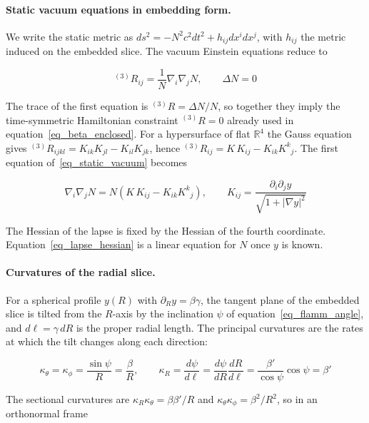\documentclass[anonymous]{iopjournal}
\begin{document}
\paragraph{Static vacuum equations in embedding form.}
We write the static metric as $ds^2=-N^2c^2dt^2+h_{ij}dx^idx^j$, with $h_{ij}$ the metric induced on the embedded slice. The vacuum Einstein equations reduce to

\begin{equation}\label{eq_static_vacuum}
    {}^{(3)}\!R_{ij}=\frac{1}{N}\nabla_i\nabla_jN,
    \qquad
    \Delta N=0
\end{equation}

The trace of the first equation is ${}^{(3)}\!R=\Delta N/N$, so together they imply the time-symmetric Hamiltonian constraint ${}^{(3)}\!R=0$ already used in equation~\eqref{eq_beta_enclosed}. For a hypersurface of flat $\mathbb{R}^4$ the Gauss equation gives ${}^{(3)}\!R_{ijkl}=K_{ik}K_{jl}-K_{il}K_{jk}$, hence ${}^{(3)}\!R_{ij}=K\,K_{ij}-K_{ik}K^{k}{}_{j}$. The first equation of~\eqref{eq_static_vacuum} becomes

\begin{equation}\label{eq_lapse_hessian}
    \nabla_i\nabla_jN=N\left(K\,K_{ij}-K_{ik}K^{k}{}_{j}\right),
    \qquad
    K_{ij}=\frac{\partial_i\partial_jy}{\sqrt{1+|\nabla y|^2}}
\end{equation}

The Hessian of the lapse is fixed by the Hessian of the fourth coordinate. Equation~\eqref{eq_lapse_hessian} is a linear equation for $N$ once $y$ is known.

\paragraph{Curvatures of the radial slice.}
For a spherical profile $y(R)$ with $\partial_Ry=\beta\gamma$, the tangent plane of the embedded slice is tilted from the $R$-axis by the inclination $\psi$ of equation~\eqref{eq_flamm_angle}, and $d\ell=\gamma\,dR$ is the proper radial length. The principal curvatures are the rates at which the tilt changes along each direction:

\begin{equation}\label{eq_principal_curvatures}
    \kappa_\theta=\kappa_\phi=\frac{\sin\psi}{R}=\frac{\beta}{R},
    \qquad
    \kappa_R=\frac{d\psi}{d\ell}=\frac{d\psi}{dR}\frac{dR}{d\ell}=\frac{\beta'}{\cos\psi}\cos\psi=\beta'
\end{equation}

The sectional curvatures are $\kappa_R\kappa_\theta=\beta\beta'/R$ and $\kappa_\theta\kappa_\phi=\beta^2/R^2$, so in an orthonormal frame
\end{document}
